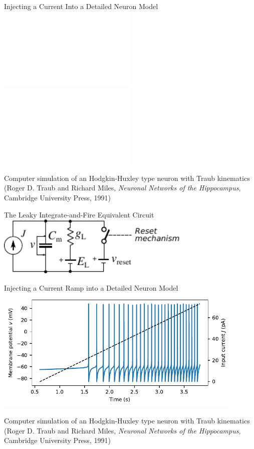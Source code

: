 \documentclass[handout,aspectratio=169]{beamer}
\begin{document}
\begin{frame}{Injecting a Current Into a Detailed Neuron Model}
	\includegraphics<1->[width=0.5\textwidth]{media/hh_neuron_sub_threshold.pdf}%
	\includegraphics<2->[width=0.5\textwidth]{media/hh_neuron_super_threshold.pdf}

	\centering
	{\tiny\color{aluminium4} Computer simulation of an Hodgkin-Huxley type neuron with Traub kinematics (Roger D. Traub and Richard Miles, \emph{Neuronal Networks of the Hippocampus},
	Cambridge University Press, 1991)}
\end{frame}

\begin{frame}{The Leaky Integrate-and-Fire Equivalent Circuit}
	\centering
	\includegraphics[width=0.7\textwidth]{media/lif_circuit.pdf}
\end{frame}

\begin{frame}{Injecting a Current Ramp into a Detailed Neuron Model}
	\centering
	\includegraphics[width=0.9\textwidth]{media/hh_neuron_ramp.pdf}

	\begin{overlayarea}{\textwidth}{1cm}
		\centering
		{\tiny\color{aluminium4} Computer simulation of an Hodgkin-Huxley type neuron with Traub kinematics (Roger D. Traub and Richard Miles, \emph{Neuronal Networks of the Hippocampus},
			Cambridge University Press, 1991)}
	\end{overlayarea}
\end{frame}
\end{document}

